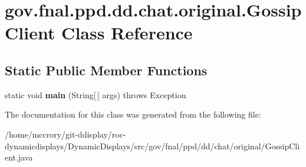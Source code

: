 \hypertarget{classgov_1_1fnal_1_1ppd_1_1dd_1_1chat_1_1original_1_1GossipClient}{\section{gov.\-fnal.\-ppd.\-dd.\-chat.\-original.\-Gossip\-Client Class Reference}
\label{classgov_1_1fnal_1_1ppd_1_1dd_1_1chat_1_1original_1_1GossipClient}
}
\subsection*{Static Public Member Functions}
\begin{DoxyCompactItemize}
\item 
\hypertarget{classgov_1_1fnal_1_1ppd_1_1dd_1_1chat_1_1original_1_1GossipClient_a4e86b84c79eaddbe83d507d3443cc5fa}{static void {\bfseries main} (String\mbox{[}$\,$\mbox{]} args)  throws Exception }\label{classgov_1_1fnal_1_1ppd_1_1dd_1_1chat_1_1original_1_1GossipClient_a4e86b84c79eaddbe83d507d3443cc5fa}

\end{DoxyCompactItemize}


The documentation for this class was generated from the following file\-:\begin{DoxyCompactItemize}
\item 
/home/mccrory/git-\/ddisplay/roc-\/dynamicdisplays/\-Dynamic\-Displays/src/gov/fnal/ppd/dd/chat/original/Gossip\-Client.\-java\end{DoxyCompactItemize}
